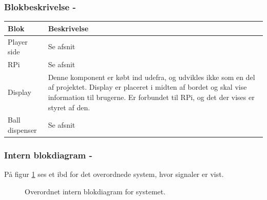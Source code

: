 \documentclass[Arkitektur/System_main.tex]{subfiles}
\begin{document}
\subsubsection{Blokbeskrivelse - } \label{sec:overall_hardware_block_description}

\begin{table}[H]
\centering
\begin{tabular}{|L{0.2\columnwidth}|L{0.7\columnwidth}|}
\hline
\textbf{Blok} & \textbf{Beskrivelse} \\ \hline
Player side & Se afsnit \textit{} \\ \hline
RPi & Se afsnit \textit{}  \\ \hline
Display & Denne komponent er købt ind udefra, og udvikles ikke som en del af projektet. Display er placeret i midten af bordet og skal vise information til brugerne. Er forbundet til RPi, og det der vises er styret af den. \\ \hline
Ball dispenser & Se afsnit \textit{}   \\ \hline
\end{tabular}
\end{table}

\subsubsection{Intern blokdiagram - } \label{sec:overall_hardware_ibd}

På figur \ref{fig:overall_hardware_ibd} ses et ibd for det overordnede system, hvor signaler er vist.

\begin{figure}[H]
    \centering
    \caption{Overordnet intern blokdiagram for systemet.}
    \label{fig:overall_hardware_ibd}
\end{figure}
\end{document}
